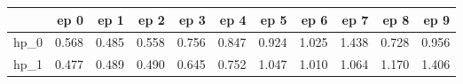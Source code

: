 \begin{tabular}{lrrrrrrrrrr}
\toprule
{} &   ep 0 &   ep 1 &   ep 2 &   ep 3 &   ep 4 &   ep 5 &   ep 6 &   ep 7 &   ep 8 &   ep 9 \\
\midrule
hp\_0 &  0.568 &  0.485 &  0.558 &  0.756 &  0.847 &  0.924 &  1.025 &  1.438 &  0.728 &  0.956 \\
hp\_1 &  0.477 &  0.489 &  0.490 &  0.645 &  0.752 &  1.047 &  1.010 &  1.064 &  1.170 &  1.406 \\
\bottomrule
\end{tabular}
